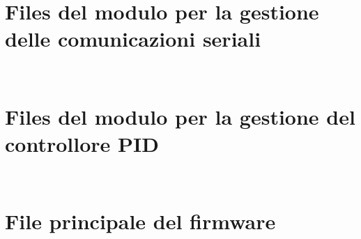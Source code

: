 \newpage

\section{Files del modulo per la gestione delle comunicazioni seriali}
\label{lst:serial_h}
\inputminted{c++}{../programmi/firmware/lib/serial/serial.h}

\label{lst:serial_cpp}
\inputminted{c++}{../programmi/firmware/lib/serial/serial.cpp}

\newpage

\section{Files del modulo per la gestione del controllore PID}
\label{lst:pid_h}
\inputminted{c++}{../programmi/firmware/lib/pid/pid.h}

\label{lst:pid_cpp}
\inputminted{c++}{../programmi/firmware/lib/pid/pid.cpp}

\newpage

\section{File principale del firmware}
\label{lst:main_cpp}
\inputminted{c++}{../programmi/firmware/src/main.cpp}
